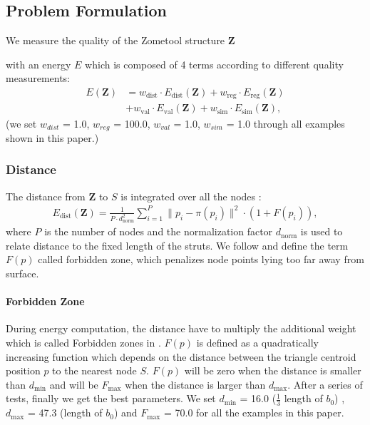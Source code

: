 
\subsection{Problem Formulation}
We measure the quality of the Zometool structure $\mathbf{Z}$ with an energy $E$ which is composed of 4 terms according to different quality measurements:
\begin{align}
\label{eq:sa_energy}
E(\mathbf{Z})&=w_{\text{dist}}\cdot E_{\text{dist}}(\mathbf{Z}) + w_{\text{reg}} \cdot E_{\text{reg}}(\mathbf{Z}) \nonumber \\ 
&+ w_{\text{val}}\cdot E_{\text{val}}(\mathbf{Z}) + 
w_{\text{sim}} \cdot E_{\text{sim}}(\mathbf{Z}),
\end{align}
(we set $w_{{dist}}$ = 1.0, $w_{{reg}}$ = 100.0, $w_{{val}}$ = 1.0, $w_{{sim}}$ = 1.0 through all examples shown in this paper.)

\subsubsection{Distance}
The distance from $\mathbf{Z}$ to $S$ is integrated over all the nodes :
\begin{align}
E_{\text{dist}}(\mathbf{Z}) = \frac{1}{P\cdot d^2_{\text{norm}}} \sum_{i=1}^{P} \|p_i - \pi(p_i) \|^2 \cdot (1+F(p_i)),
\end{align}
where $P$ is the number of nodes and the normalization factor $d_{\text{norm}}$ is used to relate distance to the fixed length of the struts.
We follow \cite{zimmer:2014:Zometool} and define the term $F(p)$ called forbidden zone, which penalizes node points lying too far away from surface. 

\paragraph{Forbidden Zone}
During energy computation, the distance have to multiply the additional weight which is called Forbidden zones in \cite{zimmer:2014:Zometool}. 
$F(p)$ is defined as a quadratically increasing function which depends on the distance between the triangle centroid position $p$ to the nearest node $S$. $F(p)$ will be zero when the distance is smaller than $d_{\text{min}}$ and will be $F_{\text{max}}$ when the distance is larger than $d_{\text{max}}$. 
After a series of tests, finally we get the best parameters. 
We set $d_{\text{min}}$ = 16.0 ($\frac{1}{3}$ length of $b_0$) , $d_{\text{max}}$ = 47.3 (length of $b_0$) and $F_{\text{max}}$ = 70.0 for all the examples in this paper. 

